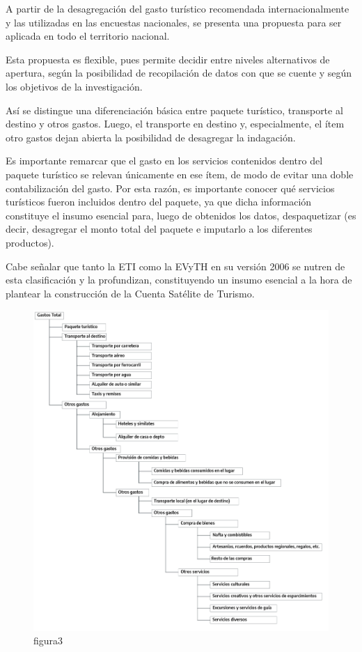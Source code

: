 \documentclass[
]{book}
\begin{document}
A partir de la desagregación del gasto turístico recomendada internacionalmente y las utilizadas en las encuestas nacionales, se presenta una propuesta para ser aplicada en todo el territorio nacional.

Esta propuesta es flexible, pues permite decidir entre niveles alternativos de apertura, según la posibilidad de recopilación de datos con que se cuente y según los objetivos de la investigación.

Así se distingue una diferenciación básica entre paquete turístico, transporte al destino y otros gastos. Luego, el transporte en destino y, especialmente, el ítem otro gastos dejan abierta la posibilidad de desagregar la indagación.

Es importante remarcar que el gasto en los servicios contenidos dentro del paquete turístico se relevan únicamente en ese ítem, de modo de evitar una doble contabilización del gasto. Por esta razón, es importante conocer qué servicios turísticos fueron incluidos dentro del paquete, ya que dicha información constituye el insumo esencial para, luego de obtenidos los datos, despaquetizar (es decir, desagregar el monto total del paquete e imputarlo a los diferentes productos).

Cabe señalar que tanto la ETI como la EVyTH en su versión 2006 se nutren de esta clasificación y la profundizan, constituyendo un insumo esencial a la hora de plantear la construcción de la Cuenta Satélite de Turismo.

\begin{figure}
\includegraphics[width=1\linewidth]{imagenes/figura_3} \caption{figura3}\label{fig:Gastototal}
\end{figure}
\end{document}
